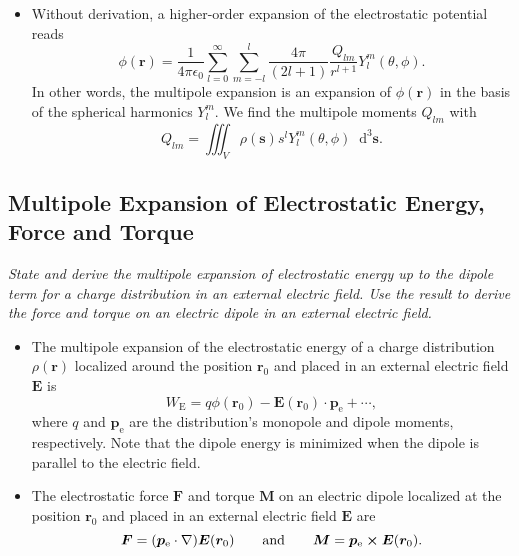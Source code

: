 \documentclass[11pt, a4paper]{article}
\newcommand{\diff}{\mathop{}\!\mathrm{d}} %
\renewcommand{\vec}[1]{\bm{#1}} %
\renewcommand{\r}{\vec{r}}
\newcommand{\E}{\vec{E}} %
\newcommand{\M}{\vec{M}}  %
\newcommand{\ee}{\epsilon_{0}}  %
\newcommand{\pe}{\vec{p}_{\text{e}}}  %
\newcommand{\s}{\vec{s}}  %
\newcommand{\ds}{\diff^{3} \s}  %
\renewcommand{\grad}{\nabla}
\begin{document}
\begin{itemize}
    
	
	\item Without derivation, a higher-order expansion of the electrostatic potential reads
	\begin{equation*}
		\phi(\r) = \frac{1}{4\pi \ee} \sum_{l=0}^{\infty}\sum_{m=-l}^{l}\frac{4\pi}{(2l+1)}\frac{Q_{lm}}{r^{l+1}}Y_{l}^{m}(\theta, \phi).
	\end{equation*}
	In other words, the multipole expansion is an expansion of $ \phi(\r) $ in the basis of the spherical harmonics $ Y_{l}^{m} $. We find the multipole moments $ Q_{lm} $ with
	\begin{equation*}
		Q_{lm} = \iiint_{V} \rho(\s)s^{l}Y_{l}^{m}(\theta, \phi) \ds.
	\end{equation*}
\end{itemize}

    
\subsection{Multipole Expansion of Electrostatic Energy, Force and Torque}
\textit{State and derive the multipole expansion of electrostatic energy up to the dipole term for a charge distribution in an external electric field. Use the result to derive the force and torque on an electric dipole in an external electric field.}

\begin{itemize}
    \item The multipole expansion of the electrostatic energy of a charge distribution $ \rho(\r) $ localized around the position $ \r_{0} $ and placed in an external electric field $ \E $ is
    \begin{equation*}
        W_{\text{E}} = q \phi(\r_{0}) - \E(\r_{0}) \cdot \pe + \cdots,
    \end{equation*}
    where $ q $ and $ \pe $ are the distribution's monopole and dipole moments, respectively. Note that the dipole energy is minimized when the dipole is parallel to the electric field.

    \item The electrostatic force $ \vec{F} $ and torque $ \vec{M} $ on an electric dipole localized at the position $ \r_{0} $ and placed in an external electric field $ \E $ are
    \begin{equation*}
        \vec{F} = (\pe \cdot \grad)\E(\r_{0}) \qquad \text{and} \qquad \M = \pe \cross \E(\r_{0}).
    \end{equation*}
    
\end{itemize}
\end{document}
